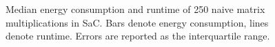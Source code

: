\documentclass[runningheads]{llncs}
\begin{document}
\begin{figure}[!t]
  \centering
  \tiny
  \begin{subfigure}{.333\linewidth}
  \end{subfigure}%
  \begin{subfigure}{.333\linewidth}
  \end{subfigure}%
  \begin{subfigure}{.333\linewidth}
  \end{subfigure}%
  \caption{Median energy consumption and runtime of 250 naive matrix multiplications in SaC.
  Bars denote energy consumption, lines denote runtime.
  Errors are reported as the interquartile range.}%
  \label{fig:matmul}
\end{figure}
\end{document}
